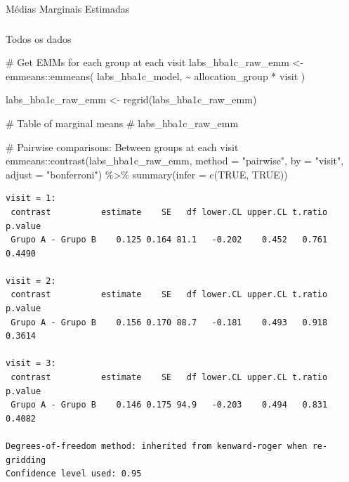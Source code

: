 \documentclass[
  12pt,
]{article}
\makeatletter
\let\oldparagraph\paragraph
\renewcommand{\paragraph}{
    \@ifstar
      \xxxParagraphStar
      \xxxParagraphNoStar
  }
\newcommand{\xxxParagraphStar}[1]{\oldparagraph*{#1}\mbox{}}
\newcommand{\xxxParagraphNoStar}[1]{\oldparagraph{#1}\mbox{}}
\let\oldsubparagraph\subparagraph
\renewcommand{\subparagraph}{
    \@ifstar
      \xxxSubParagraphStar
      \xxxSubParagraphNoStar
  }
\newcommand{\xxxSubParagraphStar}[1]{\oldsubparagraph*{#1}\mbox{}}
\newcommand{\xxxSubParagraphNoStar}[1]{\oldsubparagraph{#1}\mbox{}}
\newenvironment{Shaded}{\begin{snugshade}}{\end{snugshade}}
\newcommand{\AttributeTok}[1]{\textcolor[rgb]{0.40,0.45,0.13}{#1}}
\newcommand{\CommentTok}[1]{\textcolor[rgb]{0.37,0.37,0.37}{#1}}
\newcommand{\ConstantTok}[1]{\textcolor[rgb]{0.56,0.35,0.01}{#1}}
\newcommand{\FunctionTok}[1]{\textcolor[rgb]{0.28,0.35,0.67}{#1}}
\newcommand{\NormalTok}[1]{\textcolor[rgb]{0.00,0.23,0.31}{#1}}
\newcommand{\OtherTok}[1]{\textcolor[rgb]{0.00,0.23,0.31}{#1}}
\newcommand{\SpecialCharTok}[1]{\textcolor[rgb]{0.37,0.37,0.37}{#1}}
\newcommand{\StringTok}[1]{\textcolor[rgb]{0.13,0.47,0.30}{#1}}
\makeatother
\begin{document}
\paragraph{Médias Marginais
Estimadas}\label{muxe9dias-marginais-estimadas-9}

\subparagraph{Todos os dados}\label{todos-os-dados-9}

\begin{Shaded}
\begin{Highlighting}[]
\CommentTok{\# Get EMMs for each group at each visit}
\NormalTok{labs\_hba1c\_raw\_emm }\OtherTok{\textless{}{-}}\NormalTok{ emmeans}\SpecialCharTok{::}\FunctionTok{emmeans}\NormalTok{(}
\NormalTok{    labs\_hba1c\_model, }
    \SpecialCharTok{\textasciitilde{}}\NormalTok{ allocation\_group }\SpecialCharTok{*}\NormalTok{ visit}
\NormalTok{)}

\NormalTok{labs\_hba1c\_raw\_emm }\OtherTok{\textless{}{-}} \FunctionTok{regrid}\NormalTok{(labs\_hba1c\_raw\_emm)}

\CommentTok{\# Table of marginal means}
\CommentTok{\# labs\_hba1c\_raw\_emm}

\CommentTok{\# Pairwise comparisons: Between groups at each visit}
\NormalTok{emmeans}\SpecialCharTok{::}\FunctionTok{contrast}\NormalTok{(labs\_hba1c\_raw\_emm,}
\AttributeTok{method =} \StringTok{"pairwise"}\NormalTok{, }\AttributeTok{by =} \StringTok{"visit"}\NormalTok{,}
\AttributeTok{adjust =} \StringTok{"bonferroni"}\NormalTok{) }\SpecialCharTok{\%\textgreater{}\%} \FunctionTok{summary}\NormalTok{(}\AttributeTok{infer =} \FunctionTok{c}\NormalTok{(}\ConstantTok{TRUE}\NormalTok{, }\ConstantTok{TRUE}\NormalTok{))}
\end{Highlighting}
\end{Shaded}

\begin{verbatim}
visit = 1:
 contrast          estimate    SE   df lower.CL upper.CL t.ratio p.value
 Grupo A - Grupo B    0.125 0.164 81.1   -0.202    0.452   0.761  0.4490

visit = 2:
 contrast          estimate    SE   df lower.CL upper.CL t.ratio p.value
 Grupo A - Grupo B    0.156 0.170 88.7   -0.181    0.493   0.918  0.3614

visit = 3:
 contrast          estimate    SE   df lower.CL upper.CL t.ratio p.value
 Grupo A - Grupo B    0.146 0.175 94.9   -0.203    0.494   0.831  0.4082

Degrees-of-freedom method: inherited from kenward-roger when re-gridding 
Confidence level used: 0.95 
\end{verbatim}
\end{document}
